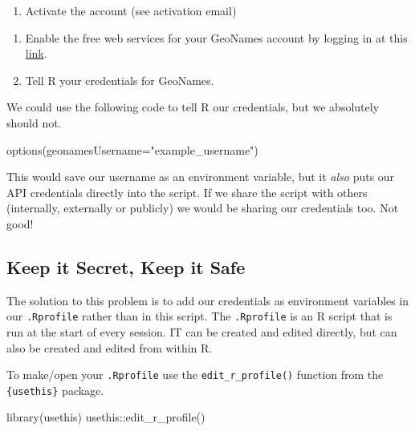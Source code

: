 \documentclass[
  12pt,
]{book}
\newenvironment{Shaded}{\begin{snugshade}}{\end{snugshade}}
\newcommand{\AttributeTok}[1]{\textcolor[rgb]{0.77,0.63,0.00}{#1}}
\newcommand{\FunctionTok}[1]{\textcolor[rgb]{0.00,0.00,0.00}{#1}}
\newcommand{\NormalTok}[1]{#1}
\newcommand{\SpecialCharTok}[1]{\textcolor[rgb]{0.00,0.00,0.00}{#1}}
\newcommand{\StringTok}[1]{\textcolor[rgb]{0.31,0.60,0.02}{#1}}
\providecommand{\tightlist}{%
  \setlength{\itemsep}{0pt}\setlength{\parskip}{0pt}}
\begin{document}
\begin{enumerate}
\def\labelenumi{\arabic{enumi}.}
\setcounter{enumi}{2}
\tightlist
\item
  Activate the account (see activation email)
\end{enumerate}

\begin{enumerate}
\def\labelenumi{\arabic{enumi}.}
\setcounter{enumi}{3}
\item
  Enable the free web services for your GeoNames account by logging in at this \href{http://www.geonames.org/enablefreewebservice}{link}.
\item
  Tell R your credentials for GeoNames.
\end{enumerate}

We could use the following code to tell R our credentials, but we absolutely should not.

\begin{Shaded}
\begin{Highlighting}[]
\FunctionTok{options}\NormalTok{(}\AttributeTok{geonamesUsername=}\StringTok{"example\_username"}\NormalTok{)}
\end{Highlighting}
\end{Shaded}

This would save our username as an environment variable, but it \emph{also} puts our API credentials directly into the script. If we share the script with others (internally, externally or publicly) we would be sharing our credentials too. Not good!

\hypertarget{keep-it-secret-keep-it-safe}{%
\subsection{Keep it Secret, Keep it Safe}\label{keep-it-secret-keep-it-safe}}

The solution to this problem is to add our credentials as environment variables in our \texttt{.Rprofile} rather than in this script. The \texttt{.Rprofile} is an R script that is run at the start of every session. IT can be created and edited directly, but can also be created and edited from within R.

To make/open your \texttt{.Rprofile} use the \texttt{edit\_r\_profile()} function from the \texttt{\{usethis\}} package.

\begin{Shaded}
\begin{Highlighting}[]
\FunctionTok{library}\NormalTok{(usethis)}
\NormalTok{usethis}\SpecialCharTok{::}\FunctionTok{edit\_r\_profile}\NormalTok{()}
\end{Highlighting}
\end{Shaded}
\end{document}
